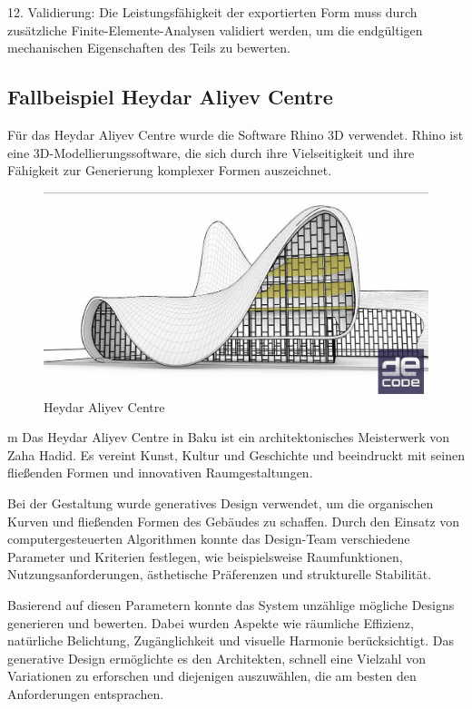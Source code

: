 12. Validierung: Die Leistungsfähigkeit der exportierten Form muss durch zusätzliche Finite-Elemente-Analysen validiert werden, um die endgültigen mechanischen Eigenschaften des Teils zu bewerten.

\subsection*{Fallbeispiel Heydar Aliyev Centre}
Für das Heydar Aliyev Centre wurde die Software Rhino 3D verwendet. Rhino ist eine 3D-Modellierungssoftware, die sich durch ihre Vielseitigkeit und ihre Fähigkeit zur Generierung komplexer Formen auszeichnet.

\begin{figure}[h]
    \begin{minipage}{0.5\textwidth}
      \centering
      \includegraphics[width=\textwidth]{./images/DE_Rh_lvl1_baku.jpg}
    \end{minipage}
    \caption{Heydar Aliyev Centre}
    \label{fig:meinbild}
  \end{figure}
m
  Das Heydar Aliyev Centre in Baku ist ein architektonisches Meisterwerk von Zaha Hadid. Es vereint Kunst, Kultur und Geschichte und beeindruckt mit seinen fließenden Formen und innovativen Raumgestaltungen.

  Bei der Gestaltung wurde generatives Design verwendet, um die organischen Kurven und fließenden Formen des Gebäudes zu schaffen. Durch den Einsatz von computergesteuerten Algorithmen konnte das Design-Team verschiedene Parameter und Kriterien festlegen, wie beispielsweise Raumfunktionen, Nutzungsanforderungen, ästhetische Präferenzen und strukturelle Stabilität.

  Basierend auf diesen Parametern konnte das System unzählige mögliche Designs generieren und bewerten. Dabei wurden Aspekte wie räumliche Effizienz, natürliche Belichtung, Zugänglichkeit und visuelle Harmonie berücksichtigt. Das generative Design ermöglichte es den Architekten, schnell eine Vielzahl von Variationen zu erforschen und diejenigen auszuwählen, die am besten den Anforderungen entsprachen.
  
